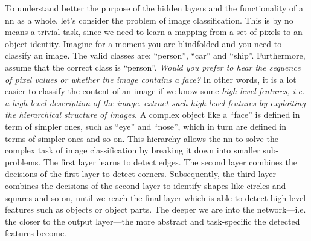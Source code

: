 To understand better the purpose of the hidden layers and the functionality of a
\gls{nn} as a whole, let's consider the problem of image
classification. This is by no means a trivial task,
since we need to learn a mapping from a set of pixels to an object identity.
Imagine for a moment you are blindfolded and you need to classify an image. The
valid classes are: ``person'', ``car'' and ``ship''. Furthermore, assume that
the correct class is ``person''. \emph{Would you prefer to hear the
sequence of pixel values or whether the image contains a face?} In other words,
it is a lot easier to classify the content of an image if we know some
\emph{high-level features, i.e. a high-level description of the
image}. \emph{ extract such high-level
features by exploiting the hierarchical structure of images}. A complex object
like a ``face'' is defined in term of simpler ones, such as ``eye'' and
``nose'', which in turn are defined in terms of simpler ones and so on. This
hierarchy allows the \gls{nn} to solve the complex task of image classification
by breaking it down into smaller sub-problems. The first layer learns to detect
edges. The second layer combines the decisions of the first layer to detect
corners. Subsequently, the third layer combines the decisions of the second
layer to identify shapes like circles and squares and so on, until we reach the
final layer which is able to detect high-level features such as objects or
object parts. The deeper we are into the network---i.e. the closer to the output
layer---the more abstract and task-specific the detected
features become.

